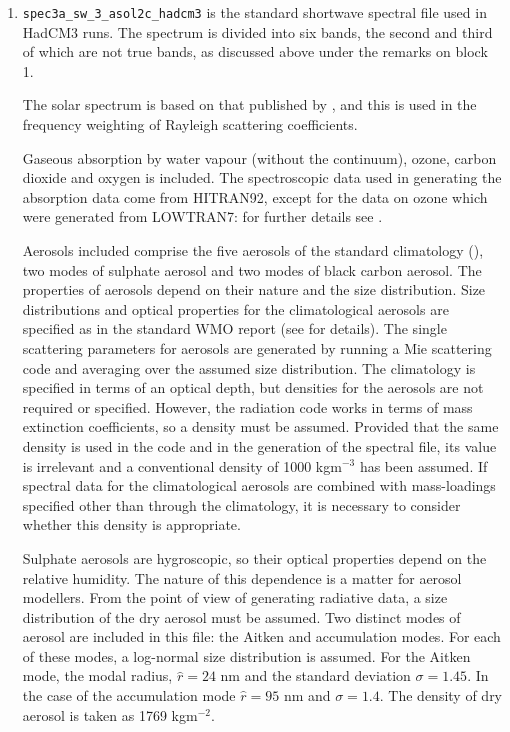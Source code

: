 \begin{enumerate}

\item
{\large \tt spec3a\_sw\_3\_asol2c\_hadcm3} is the standard shortwave spectral 
file used in HadCM3 runs. The spectrum is divided into six bands, the
second and third of which are not true bands, as discussed above
under the remarks on block 1.

The solar spectrum is based on that published by \citet{Labs70}, and
this is used in the frequency weighting of Rayleigh scattering 
coefficients.

Gaseous absorption by water vapour (without the continuum), ozone, 
carbon dioxide and oxygen is included. The
spectroscopic data used in generating the absorption data come from 
HITRAN92, except
for the data on ozone which were generated from LOWTRAN7: for further
details see \citet{Cusack99ck}.

Aerosols included comprise the five aerosols of the standard climatology
(\citet{Cusack98a}), two modes of sulphate aerosol and two modes of
black carbon aerosol.
The properties of aerosols depend on their nature and the size distribution.
Size distributions and optical properties for the climatological aerosols
are specified as in the standard WMO report (see \citet{Cusack98a} for
details). 
The single scattering parameters for aerosols are generated by running a 
Mie scattering code and averaging over the assumed size distribution.
The climatology is specified in terms of an optical depth, but densities
for the aerosols are not required or specified. However, the radiation
code works in terms of mass extinction coefficients, so a density must
be assumed. Provided that the same density is used in the code and in
the generation of the spectral file, its value is irrelevant and a 
conventional density of 1000 kgm${}^{-3}$ has been assumed. If spectral
data for the climatological aerosols are combined with mass-loadings
specified other than through the climatology, it is necessary to
consider whether this density is appropriate.

Sulphate aerosols are hygroscopic, so their optical properties depend on
the relative humidity. The nature of this dependence is a matter for
aerosol modellers. From the point of view of generating radiative data,
a size distribution of the dry aerosol must be assumed. Two distinct
modes of aerosol are included in this file: the Aitken and accumulation
modes. For each of these modes, a log-normal size distribution is assumed.
For the Aitken mode, the modal radius, $\hat r = 24$ nm and the 
standard deviation $\sigma=1.45$. In the case of the accumulation mode
$\hat r = 95$ nm and $\sigma=1.4$. The density of dry aerosol is taken
as 1769 kgm${}^{-2}$.


\end{enumerate}
